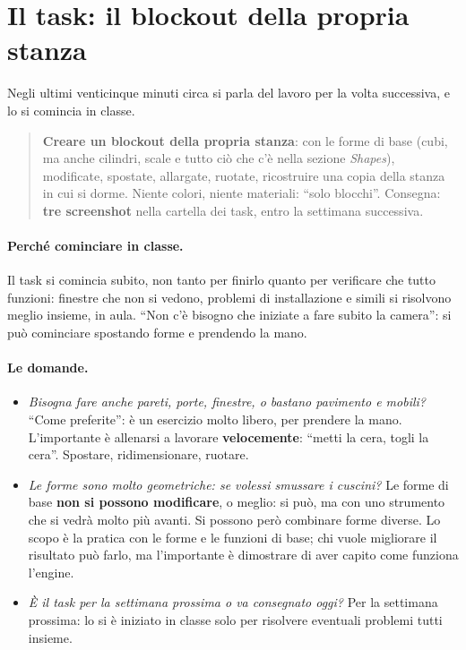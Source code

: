 \section{Il task: il blockout della propria stanza}
\label{gd8:sec:task}



Negli ultimi venticinque minuti circa si parla del lavoro per la volta
successiva, e lo si comincia in classe.

\begin{quote}
\textbf{Creare un blockout della propria stanza}: con le forme di base
(cubi, ma anche cilindri, scale e tutto ciò che c'è nella sezione
\emph{Shapes}), modificate, spostate, allargate, ruotate, ricostruire una
copia della stanza in cui si dorme. Niente colori, niente materiali: ``solo
blocchi''. Consegna: \textbf{tre screenshot} nella cartella dei task, entro
la settimana successiva.
\end{quote}

\paragraph{Perché cominciare in classe.} Il task si comincia subito, non
tanto per finirlo quanto per verificare che tutto funzioni: finestre che non si
vedono, problemi di installazione e simili si risolvono meglio insieme, in
aula. ``Non c'è bisogno che iniziate a fare subito la camera'': si può
cominciare spostando forme e prendendo la mano.

\paragraph{Le domande.}
\begin{itemize}
  \item \emph{Bisogna fare anche pareti, porte, finestre, o bastano
        pavimento e mobili?} ``Come preferite'': è un esercizio molto libero,
        per prendere la mano. L'importante è allenarsi a lavorare
        \textbf{velocemente}: ``metti la cera, togli la cera''. Spostare,
        ridimensionare, ruotare.
  \item \emph{Le forme sono molto geometriche: se volessi smussare i
        cuscini?} Le forme di base \textbf{non si possono modificare}, o
        meglio: si può, ma con uno strumento che si vedrà molto più avanti.
        Si possono però combinare forme diverse. Lo scopo è la pratica con le
        forme e le funzioni di base; chi vuole migliorare il risultato può
        farlo, ma l'importante è dimostrare di aver capito come funziona
        l'engine.
  \item \emph{È il task per la settimana prossima o va consegnato oggi?}
        Per la settimana prossima: lo si è iniziato in classe solo per
        risolvere eventuali problemi tutti insieme.
\end{itemize}


